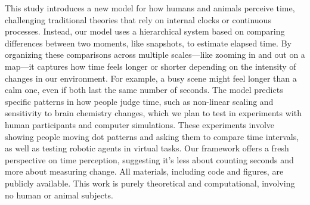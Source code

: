 \documentclass[preprint,11pt]{elsarticle}
\begin{document}
This study introduces a new model for how humans and animals perceive time, challenging traditional theories that rely on internal clocks or continuous processes. Instead, our model uses a hierarchical system based on comparing differences between two moments, like snapshots, to estimate elapsed time. By organizing these comparisons across multiple scales---like zooming in and out on a map---it captures how time feels longer or shorter depending on the intensity of changes in our environment. For example, a busy scene might feel longer than a calm one, even if both last the same number of seconds. The model predicts specific patterns in how people judge time, such as non-linear scaling and sensitivity to brain chemistry changes, which we plan to test in experiments with human participants and computer simulations. These experiments involve showing people moving dot patterns and asking them to compare time intervals, as well as testing robotic agents in virtual tasks. Our framework offers a fresh perspective on time perception, suggesting it's less about counting seconds and more about measuring change. All materials, including code and figures, are publicly available. This work is purely theoretical and computational, involving no human or animal subjects.



\end{document}
